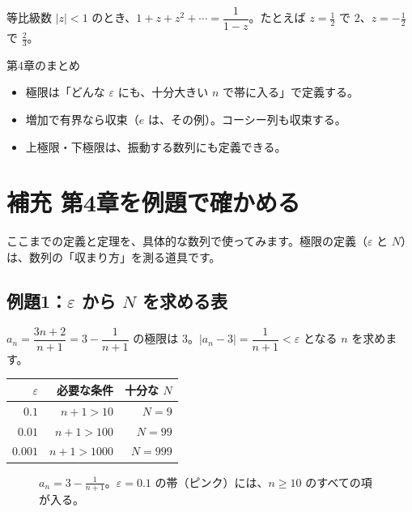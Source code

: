 \documentclass[a4paper,11pt,openany]{ltjsbook}
\begin{document}
\begin{examplebox}{等比級数}
$|z|<1$ のとき、$1+z+z^2+\cdots=\dfrac{1}{1-z}$。たとえば $z=\frac12$ で $2$、$z=-\frac12$ で $\frac23$。
\end{examplebox}

\begin{pointbox}{第4章のまとめ}
\begin{itemize}[leftmargin=1.5em]
\item 極限は「どんな $\varepsilon$ にも、十分大きい $n$ で帯に入る」で定義する。
\item 増加で有界なら収束（$e$ は、その例）。コーシー列も収束する。
\item 上極限・下極限は、振動する数列にも定義できる。
\end{itemize}
\end{pointbox}

\section{補充 第4章を例題で確かめる}

ここまでの定義と定理を、具体的な数列で使ってみます。極限の定義（$\varepsilon$ と $N$）は、数列の「収まり方」を測る道具です。

\subsection*{例題1：$\varepsilon$ から $N$ を求める表}

$a_n=\dfrac{3n+2}{n+1}=3-\dfrac{1}{n+1}$ の極限は $3$。$|a_n-3|=\dfrac1{n+1}<\varepsilon$ となる $n$ を求めます。

\begin{center}
\begin{tabular}{rrr}
\toprule
$\varepsilon$ & 必要な条件 & 十分な $N$\\
\midrule
$0.1$ & $n+1>10$ & $N=9$\\
$0.01$ & $n+1>100$ & $N=99$\\
$0.001$ & $n+1>1000$ & $N=999$\\
\bottomrule
\end{tabular}
\end{center}

\begin{figure}[htbp]
\centering
{}
\caption{$a_n=3-\frac1{n+1}$。$\varepsilon=0.1$ の帯（ピンク）には、$n\ge10$ のすべての項が入る。}
\end{figure}
\end{document}
